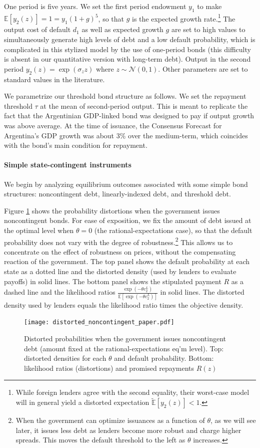 One period is five years. We set the first period endowment $y_1$ to make $\mathbb{E}[y_2(z)] = 1 = y_1 (1+g)^5$, so that $g$ is the expected growth rate.\footnote{While foreign lenders agree with the second equality, their worst-case model will in general yield a distorted expectation $\tilde{\mathbb{E}}[y_2(z)] < 1$.} The output cost of default $d_1$ as well as expected growth $g$ are set to high values to simultaneously generate high levels of debt and a low default probability, which is complicated in this stylized model by the use of one-period bonds (this difficulty is absent in our quantitative version with long-term debt). Output in the second period $y_2(z) = \exp(\sigma_z z)$ where $z \sim \mathcal{N}(0,1)$. Other parameters are set to standard values in the literature.

We parametrize our threshold bond structure as follows. We set the repayment threshold $\tau$ at the mean of second-period output. This is meant to replicate the fact that the Argentinian GDP-linked bond was designed to pay if output growth was above average. At the time of issuance, the Consensus Forecast for Argentina's GDP growth was about 3\% over the medium-term, which coincides with the bond's main condition for repayment.

\paragraph{Simple state-contingent instruments}
We begin by analyzing equilibrium outcomes associated with some simple bond structures: noncontingent debt, linearly-indexed debt, and threshold debt.

Figure \ref{Figure_distorted_noncontingent} shows the probability distortions when the government issues noncontingent bonds. For ease of exposition, we fix the amount of debt issued at the optimal level when $\theta = 0$ (the rational-expectations case), so that the default probability does not vary with the degree of robustness.\footnote{When the government can optimize issuances as a function of $\theta$, as we will see later, it issues less debt as lenders become more robust and charge higher spreads. This moves the default threshold to the left as $\theta$ increases.} This allows us to concentrate on the effect of robustness on prices, without the compensating reaction of the government. The top panel shows the default probability at each state as a dotted line and the distorted density (used by lenders to evaluate payoffs) in solid lines. The bottom panel shows the stipulated payment $R$ as a dashed line and the likelihood ratios $\frac{\exp(-\theta c_2^L)}{\mathbb{E}\left[\exp(-\theta c_2^L)\right]}$ in solid lines. The distorted density used by lenders equals the likelihood ratio times the objective density.
\begin{figure}[!hbtp]\centering
    \texttt{[image: distorted\_noncontingent\_paper.pdf]}
\caption{Distorted probabilities when the government issues noncontingent debt (amount fixed at the rational-expectations eq'm level). Top: distorted densities for each $\theta$ and default probability. Bottom: likelihood ratios (distortions) and promised repayments $R(z)$
\label{Figure_distorted_noncontingent}}
\end{figure}

